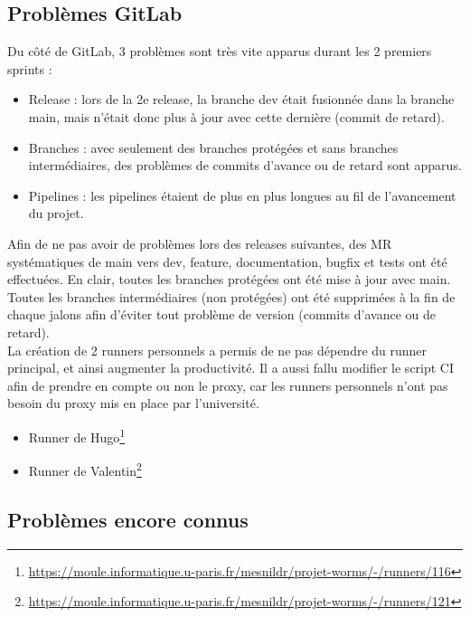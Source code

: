 \documentclass[a4paper, 12pt]{article}
\begin{document}
        \subsection{Problèmes GitLab}
            Du côté de GitLab, 3 problèmes sont très vite apparus durant les 2 premiers sprints :
            \begin{itemize}
                \item Release : lors de la 2e release, la branche dev était fusionnée dans la branche main, mais n'était donc plus à jour avec cette dernière (commit de retard).
                \item Branches : avec seulement des branches protégées et sans branches intermédiaires, des problèmes de commits d'avance ou de retard sont apparus.
                \item Pipelines : les pipelines étaient de plus en plus longues au fil de l'avancement du projet.
            \end{itemize}
            Afin de ne pas avoir de problèmes lors des releases suivantes, des MR systématiques de main vers dev, feature, documentation, bugfix et tests ont été effectuées.
            En clair, toutes les branches protégées ont été mise à jour avec main.\\
            Toutes les branches intermédiaires (non protégées) ont été supprimées à la fin de chaque jalons afin d'éviter tout problème de version (commits d'avance ou de retard).\\
            La création de 2 runners personnels a permis de ne pas dépendre du runner principal, et ainsi augmenter la productivité. Il a aussi fallu modifier le script CI afin de prendre en compte ou non le proxy, car les runners personnels n'ont pas besoin du proxy mis en place par l'université.
            \begin{itemize}
                \item Runner de Hugo\footnote{\href{https://moule.informatique.u-paris.fr/mesnildr/projet-worms/-/runners/116}{https://moule.informatique.u-paris.fr/mesnildr/projet-worms/-/runners/116}}
                \item Runner de Valentin\footnote{\href{https://moule.informatique.u-paris.fr/mesnildr/projet-worms/-/runners/121}{https://moule.informatique.u-paris.fr/mesnildr/projet-worms/-/runners/121}}
            \end{itemize}
        
        \subsection{Problèmes encore connus}
\end{document}
